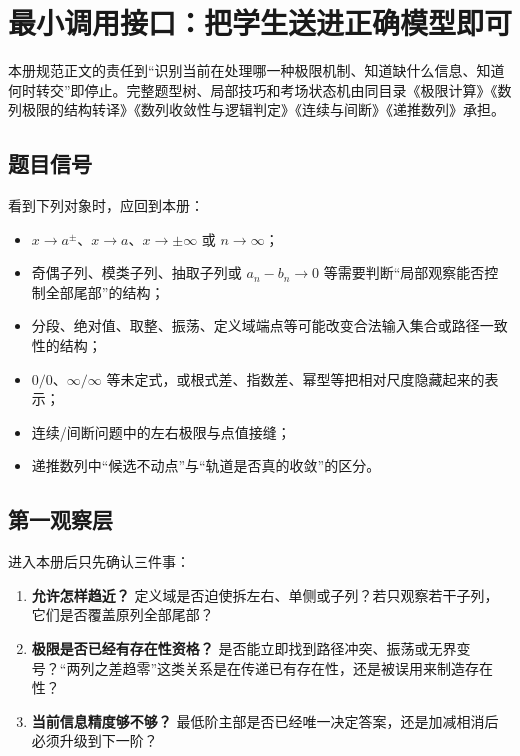 \documentclass[11pt,a4paper]{ctexart}
\begin{document}
\section{最小调用接口：把学生送进正确模型即可}

本册规范正文的责任到“识别当前在处理哪一种极限机制、知道缺什么信息、知道何时转交”即停止。完整题型树、局部技巧和考场状态机由同目录《极限计算》《数列极限的结构转译》《数列收敛性与逻辑判定》《连续与间断》《递推数列》承担。

\subsection{题目信号}

看到下列对象时，应回到本册：
\begin{itemize}
  \item $x\to a^\pm$、$x\to a$、$x\to\pm\infty$ 或 $n\to\infty$；
  \item 奇偶子列、模类子列、抽取子列或 $a_n-b_n\to0$ 等需要判断“局部观察能否控制全部尾部”的结构；
  \item 分段、绝对值、取整、振荡、定义域端点等可能改变合法输入集合或路径一致性的结构；
  \item $0/0$、$\infty/\infty$ 等未定式，或根式差、指数差、幂型等把相对尺度隐藏起来的表示；
  \item 连续/间断问题中的左右极限与点值接缝；
  \item 递推数列中“候选不动点”与“轨道是否真的收敛”的区分。
\end{itemize}

\subsection{第一观察层}

进入本册后只先确认三件事：
\begin{enumerate}
  \item \textbf{允许怎样趋近？} 定义域是否迫使拆左右、单侧或子列？若只观察若干子列，它们是否覆盖原列全部尾部？
  \item \textbf{极限是否已经有存在性资格？} 是否能立即找到路径冲突、振荡或无界变号？“两列之差趋零”这类关系是在传递已有存在性，还是被误用来制造存在性？
  \item \textbf{当前信息精度够不够？} 最低阶主部是否已经唯一决定答案，还是加减相消后必须升级到下一阶？
\end{enumerate}
\end{document}
